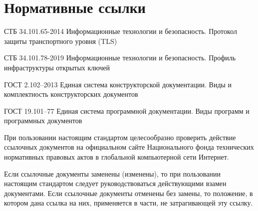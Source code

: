 \chapter{Нормативные ссылки}\label{REFS}

СТБ 34.101.65-2014 Информационные технологии и безопасность. Протокол защиты 
транспортного уровня (TLS)

СТБ 34.101.78-2019 Информационные технологии и безопасность. Профиль 
инфраструктуры открытых ключей

ГОСТ 2.102–2013 Единая система конструкторской документации. Виды и 
комплектность конструкторских документов

ГОСТ 19.101–77 Единая система программной документации. Виды программ и 
программных документов

\begin{note*}
При пользовании настоящим стандартом целесообразно проверить действие
ссылочных документов на официальном сайте Национального фонда
технических нормативных правовых актов в глобальной компьютерной сети Интернет.

Если ссылочные документы заменены (изменены), то при пользовании
настоящим стандартом следует руководствоваться действующими взамен
документами. Если ссылочные документы отменены без замены, то положение, в 
котором дана ссылка на них, применяется в части, не затрагивающей эту ссылку.
\end{note*}


